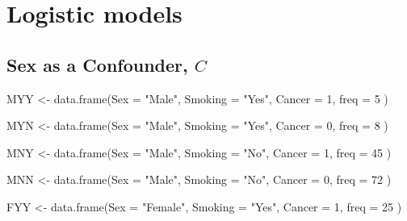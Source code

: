 \documentclass[
]{book}
\newenvironment{Shaded}{\begin{snugshade}}{\end{snugshade}}
\newcommand{\AttributeTok}[1]{\textcolor[rgb]{0.77,0.63,0.00}{#1}}
\newcommand{\DecValTok}[1]{\textcolor[rgb]{0.00,0.00,0.81}{#1}}
\newcommand{\FunctionTok}[1]{\textcolor[rgb]{0.00,0.00,0.00}{#1}}
\newcommand{\NormalTok}[1]{#1}
\newcommand{\OtherTok}[1]{\textcolor[rgb]{0.56,0.35,0.01}{#1}}
\newcommand{\StringTok}[1]{\textcolor[rgb]{0.31,0.60,0.02}{#1}}
\begin{document}
\hypertarget{logistic-models}{%
\section{Logistic models}\label{logistic-models}}

\hypertarget{sex-as-a-confounder-c}{%
\subsection{\texorpdfstring{Sex as a Confounder, \(C\)}{Sex as a Confounder, C}}\label{sex-as-a-confounder-c}}

\begin{Shaded}
\begin{Highlighting}[]
\NormalTok{MYY }\OtherTok{\textless{}{-}} \FunctionTok{data.frame}\NormalTok{(}\AttributeTok{Sex =} \StringTok{"Male"}\NormalTok{,}
                  \AttributeTok{Smoking =} \StringTok{"Yes"}\NormalTok{,}
                  \AttributeTok{Cancer =} \DecValTok{1}\NormalTok{,}
                  \AttributeTok{freq =} \DecValTok{5}
\NormalTok{                  )}

\NormalTok{MYN }\OtherTok{\textless{}{-}} \FunctionTok{data.frame}\NormalTok{(}\AttributeTok{Sex =} \StringTok{"Male"}\NormalTok{,}
                  \AttributeTok{Smoking =} \StringTok{"Yes"}\NormalTok{,}
                  \AttributeTok{Cancer =} \DecValTok{0}\NormalTok{,}
                  \AttributeTok{freq =} \DecValTok{8}
\NormalTok{                  )}

\NormalTok{MNY }\OtherTok{\textless{}{-}} \FunctionTok{data.frame}\NormalTok{(}\AttributeTok{Sex =} \StringTok{"Male"}\NormalTok{,}
                  \AttributeTok{Smoking =} \StringTok{"No"}\NormalTok{,}
                  \AttributeTok{Cancer =} \DecValTok{1}\NormalTok{,}
                  \AttributeTok{freq =} \DecValTok{45}
\NormalTok{                  )}

\NormalTok{MNN }\OtherTok{\textless{}{-}} \FunctionTok{data.frame}\NormalTok{(}\AttributeTok{Sex =} \StringTok{"Male"}\NormalTok{,}
                  \AttributeTok{Smoking =} \StringTok{"No"}\NormalTok{,}
                  \AttributeTok{Cancer =} \DecValTok{0}\NormalTok{,}
                  \AttributeTok{freq =} \DecValTok{72}
\NormalTok{                  )}


\NormalTok{FYY }\OtherTok{\textless{}{-}} \FunctionTok{data.frame}\NormalTok{(}\AttributeTok{Sex =} \StringTok{"Female"}\NormalTok{,}
                  \AttributeTok{Smoking =} \StringTok{"Yes"}\NormalTok{,}
                  \AttributeTok{Cancer =} \DecValTok{1}\NormalTok{,}
                  \AttributeTok{freq =} \DecValTok{25}
\NormalTok{                  )}


\end{Highlighting}
\end{Shaded}
\end{document}
